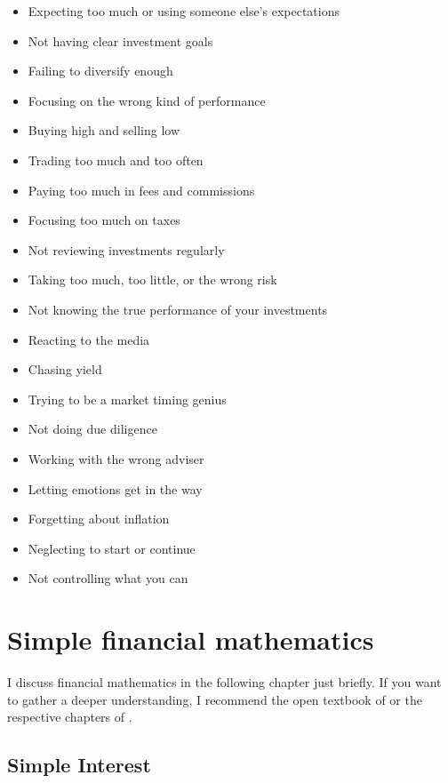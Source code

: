 \begin{itemize}
	
	\item
	Expecting too much or using someone else's expectations
	\item
	Not having clear investment goals
	\item
	Failing to diversify enough
	\item
	Focusing on the wrong kind of performance
	\item
	Buying high and selling low
	\item
	Trading too much and too often
	\item
	Paying too much in fees and commissions
	\item
	Focusing too much on taxes
	\item
	Not reviewing investments regularly
	\item
	Taking too much, too little, or the wrong risk
	\item
	Not knowing the true performance of your investments
	\item
	Reacting to the media
	\item
	Chasing yield
	\item
	Trying to be a market timing genius
	\item
	Not doing due diligence
	\item
	Working with the wrong adviser
	\item
	Letting emotions get in the way
	\item
	Forgetting about inflation
	\item
	Neglecting to start or continue
	\item
	Not controlling what you can
\end{itemize}


\section{Simple financial mathematics}\label{simple-financial-mathematics}

I discuss financial mathematics in the following chapter just briefly. If you want to gather a deeper understanding, I recommend the open textbook of \citet{Dahlquist2022Principles} or the respective chapters of \citet{Wilkinson2022Managerial}.


\subsection{Simple Interest}\label{simple-interest}

